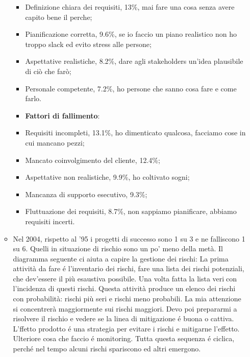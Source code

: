 \documentclass[a4paper,10pt] {article}
\begin{document}
\begin{itemize}
\begin{itemize}
\begin{itemize}
	\item Definizione chiara dei requisiti, 13\%, mai fare una cosa senza avere 
	 capito bene il perche;
	 
	\item Pianificazione corretta, 9.6\%, se io faccio un piano realistico non 
	ho troppo slack ed evito stress alle persone;
	
	\item Aspettative realistiche, 8.2\%, dare agli stakeholders un'idea 
	plausibile di ciò che farò;

	\item Personale competente, 7.2\%, ho persone che sanno cosa fare e come 
	farlo.
	
	
	\item \textbf{Fattori di fallimento}:
	
	\item Requisiti incompleti, 13.1\%, ho dimenticato qualcosa, facciamo cose 
	in cui mancano pezzi;
	
	\item Mancato coinvolgimento del cliente, 12.4\%;
	
	\item Aspettative non realistiche, 9.9\%, ho coltivato sogni;
	
	\item Mancanza di supporto esecutivo, 9.3\%;
	
	\item Fluttuazione dei requisiti, 8.7\%, non sappiamo pianificare, abbiamo 
	requisiti incerti.
	\end{itemize}


	\item Nel 2004, rispetto al '95 i progetti di successo sono 1 su 3 e ne 
	falliscono 1 su 6. Quelli in situazione di rischio
	sono un po' meno della metà. Il diagramma seguente ci aiuta a capire la 
	gestione dei rischi:
	La prima attività da fare é l'inventario dei rischi, fare una lista dei 
	rischi potenziali, che dev'essere il più
	esaustiva possibile. Una volta fatta la lista vericon l'incidenza di 
	questi 
	rischi. Questa attività produce un
	elenco dei rischi con probabilità: rischi più seri e rischi meno 
	probabili. La mia attenzione si concentrerà
	maggiormente sui rischi maggiori. Devo poi prepararmi a risolvere il 
	rischio e vedere se la linea di mitigazione
	é buona o cattiva. L'ffetto prodotto é una strategia per evitare i rischi 
	e mitigarne l'effetto. Ulteriore cosa
	che faccio é monitoring. Tutta questa sequenza é ciclica, perché nel 
	tempo alcuni rischi spariscono ed altri
	emergono.
	

\end{itemize}
\end{itemize}
\end{document}
